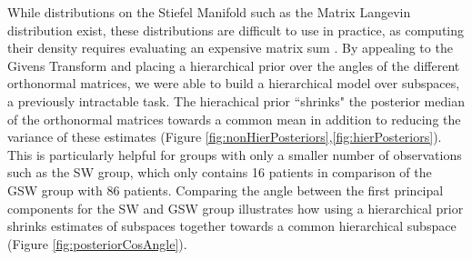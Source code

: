 \documentclass{article}
\begin{document}
While distributions on the Stiefel Manifold such as the Matrix Langevin distribution \citep{muirhead2009aspects} exist, these distributions are difficult to use in practice, as computing their density requires evaluating an expensive matrix sum \citep{hoff2009simulation}. By appealing to the Givens Transform and placing a hierarchical prior over the angles of the different orthonormal matrices, we were able to build a hierarchical model over subspaces, a previously intractable task. The hierachical prior ``shrinks" the posterior median of the orthonormal matrices towards a common mean in addition to reducing the variance of these estimates (Figure \ref{fig:nonHierPosteriors},\ref{fig:hierPosteriors}). This is particularly helpful for groups with only a smaller number of observations such as the SW group, which only contains 16 patients in comparison of the GSW group with 86 patients. Comparing the angle between the first principal components for the SW and GSW group illustrates how using a hierarchical prior shrinks estimates of subspaces together towards a common hierarchical subspace (Figure \ref{fig:posteriorCosAngle}).
\end{document}

